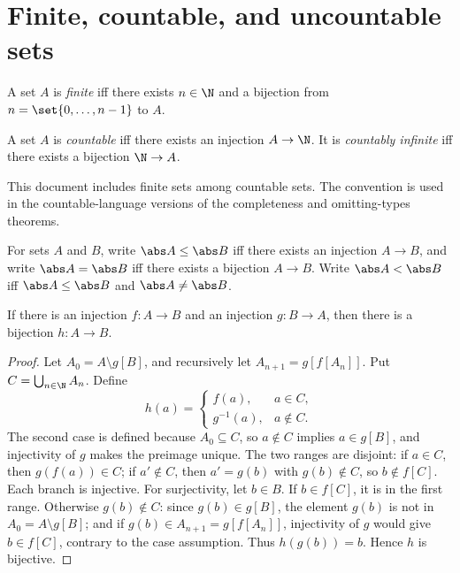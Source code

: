\section{Finite, countable, and uncountable sets}
\label{sec:set-prerequisites-05}

\begin{definition}
A set \(A\) is \emph{finite} iff there exists \(n\in\N\) and a bijection from
\(n=\set{0,\ldots,n-1}\) to \(A\).
\end{definition}

\begin{definition}
A set \(A\) is \emph{countable} iff there exists an injection \(A\to\N\).
It is \emph{countably infinite} iff there exists a bijection \(\N\to A\).
\end{definition}

This document includes finite sets among countable sets.  The convention is
used in the countable-language versions of the completeness and omitting-types
theorems.

\begin{definition}
For sets \(A\) and \(B\), write \(\abs A\leq\abs B\) iff there exists an
injection \(A\to B\), and write \(\abs A=\abs B\) iff there exists a bijection
\(A\to B\).  Write \(\abs A<\abs B\) iff
\(\abs A\leq\abs B\) and \(\abs A\ne\abs B\).
\end{definition}

\begin{theorem}
If there is an injection \(f:A\to B\) and an injection \(g:B\to A\), then
there is a bijection \(h:A\to B\).
\end{theorem}
\begin{proof}
Let \(A_0=A\setminus g[B]\), and recursively let
\(A_{n+1}=g[f[A_n]]\).  Put \(C=\bigcup_{n\in\N}A_n\).  Define
\[
  h(a)=
  \begin{cases}
    f(a),&a\in C,\\
    g^{-1}(a),&a\notin C.
  \end{cases}
\]
The second case is defined because \(A_0\subseteq C\), so
\(a\notin C\) implies \(a\in g[B]\), and injectivity of \(g\) makes the
preimage unique.  The two ranges are disjoint: if \(a\in C\), then
\(g(f(a))\in C\); if \(a'\notin C\), then \(a'=g(b)\) with
\(g(b)\notin C\), so \(b\notin f[C]\).  Each branch is injective.  For
surjectivity, let \(b\in B\).  If \(b\in f[C]\), it is in the first range.
Otherwise \(g(b)\notin C\): since \(g(b)\in g[B]\), the element
\(g(b)\) is not in \(A_0=A\setminus g[B]\); and if
\(g(b)\in A_{n+1}=g[f[A_n]]\), injectivity of \(g\) would give
\(b\in f[C]\), contrary to the case assumption.  Thus
\(h(g(b))=b\).  Hence \(h\) is bijective.
\end{proof}

